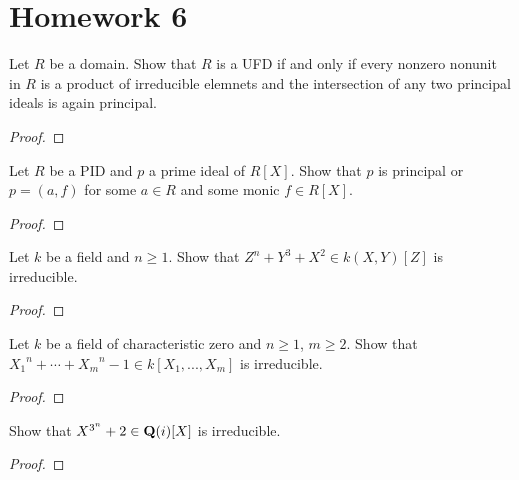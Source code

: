 \chapter{Homework 6}
\begin{problem}
Let $R$ be a domain. Show that $R$ is a UFD if and only if every nonzero
nonunit in $R$ is a product of irreducible elemnets and the intersection of
any two principal ideals is again principal.
\end{problem}
\begin{proof}
\end{proof}

\begin{problem}
Let $R$ be a PID and $p$ a prime ideal of $R[X]$. Show that $p$ is
principal or $p=(a,f)$ for some $a\in R$ and some monic $f\in R[X]$.
\end{problem}
\begin{proof}
\end{proof}

\begin{problem}
Let $k$ be a field and $n\geq 1$. Show that $Z^n+Y^3+X^2\in k(X,Y)[Z]$ is
irreducible.
\end{problem}
\begin{proof}
\end{proof}

\begin{problem}
Let $k$ be a field of characteristic zero and $n\geq 1$, $m\geq 2$. Show
that ${X_1}^n+\cdots+{X_m}^n-1\in k[X_1,...,X_m]$ is irreducible.
\end{problem}
\begin{proof}
\end{proof}

\begin{problem}
Show that $X^{3^n}+2\in\mathbf{Q}(i)[X]$ is irreducible.
\end{problem}
\begin{proof}
\end{proof}

